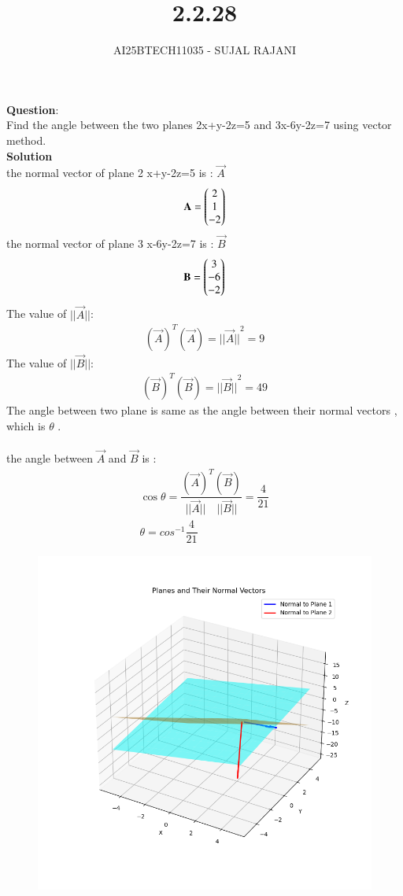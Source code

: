 \documentclass[journal,12pt,onecolumn]{IEEEtran}
\begin{document}
\title{2.2.28}
\author{AI25BTECH11035 - SUJAL RAJANI}
{\let\newpage\relax\maketitle}
\textbf{Question}:
\\
 Find the angle between the two planes 2x+y-2z=5 and 3x-6y-2z=7 using vector method.
 \\
 \textbf{Solution}
 \\
 the   normal vector of plane 2 x+y-2z=5 is : $\vec{A}$
 \begin{align*}
     \mathbf{A}=\begin{pmatrix}2\\1\\-2\end{pmatrix}
 \end{align*}
 the normal vector of plane 3 x-6y-2z=7 is : $\vec{B}$
 \begin{align*}
     \mathbf{B}=\begin{pmatrix}3\\-6\\-2\end{pmatrix}
 \end{align*} 
 The value of $||\vec{A}||$:
  \begin{align*}
     (\vec{A})^T(\vec{A})={||\vec{A}||}^2=9
 \end{align*}
 The value of $||\vec{B}||$:
  \begin{align*}
     (\vec{B })^T(\vec{B})={||\vec{B}||}^2=49
 \end{align*}
 The angle between two plane is same as the angle between their normal vectors , which is  $\theta$ .
\\
\\
 the angle between $\vec{A}$ and $\vec{B}$ is :
 \begin{align*}
      \cos{\theta} = \dfrac{(\vec{A})^T(\vec{B})}{||\vec{A}||\quad||\vec{B}||}=\dfrac{4}{21}
      \\
      \theta=cos^{-1}\dfrac{4}{21}
 \end{align*}
        \begin{figure}[H]
    \centering
    \includegraphics[width = 0.7\columnwidth]{figs/img.png}
    \caption*{}
    \label{figs}
\end{figure}
\end{document}
